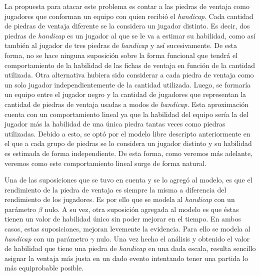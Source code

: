 \documentclass[11pt,twoside,spanish]{report} %
\begin{document}

La propuesta para atacar este problema es contar a las piedras de ventaja como jugadores que conforman un equipo con quien recibi\'o el \emph{handicap}.
Cada cantidad de piedras de ventaja diferente se la considera un jugador distinto.
Es decir, dos piedras de \textit{handicap} es un jugador al que se le va a estimar su habilidad, como as\'i tambi\'en al jugador de tres piedras de \textit{handicap} y as\'i sucesivamente.
De esta forma, no se hace ninguna suposici\'on sobre la forma funcional que tendr\'a el comportamiento de la habilidad de las fichas de ventaja en funci\'on de la cantidad utilizada.
Otra alternativa hubiera sido considerar a cada piedra de ventaja como un solo jugador independientemente de la cantidad utilizada. 
Luego, se formar\'ia un equipo entre el jugador negro y la cantidad de jugadores que representan la cantidad de piedras de ventaja usadas a modos de \textit{handicap}.
Esta aproximaci\'on cuenta con un comportamiento lineal ya que la habilidad del equipo ser\'ia la del jugador m\'as la habilidad de una \'unica piedra tantas veces como piedras utilizadas.
Debido a esto, se opt\'o por el modelo libre descripto anteriormente en el que a cada grupo de piedras se lo considera un jugador distinto y su habilidad es estimada de forma independiente.
De esta forma, como veremos m\'as adelante, veremos como este comportamiento lineal surge de forma natural.


Una de las suposiciones que se tuvo en cuenta y se lo agreg\'o al modelo, es que el rendimiento de la piedra de ventaja es siempre la misma a diferencia del rendimiento de los jugadores.
Es por ello que se modela al \textit{handicap} con un par\'ametro $\beta$ nulo.
A su vez, otra suposici\'on agregada al modelo es que \'estas tienen un valor de habilidad \'unico sin poder mejorar en el tiempo.
En ambos casos, estas suposiciones, mejoran levemente la evidencia.
Para ello se  modela al \textit{handicap} con un par\'ametro $\gamma$ nulo.
Una vez hecho el an\'alisis y obtenido el valor de habilidad que tiene una piedra de \textit{handicap} en una dada escala, resulta sencillo asignar la ventaja m\'as justa en un dado evento intentando tener una partida  lo m\'as equiprobable posible.
\end{document}
